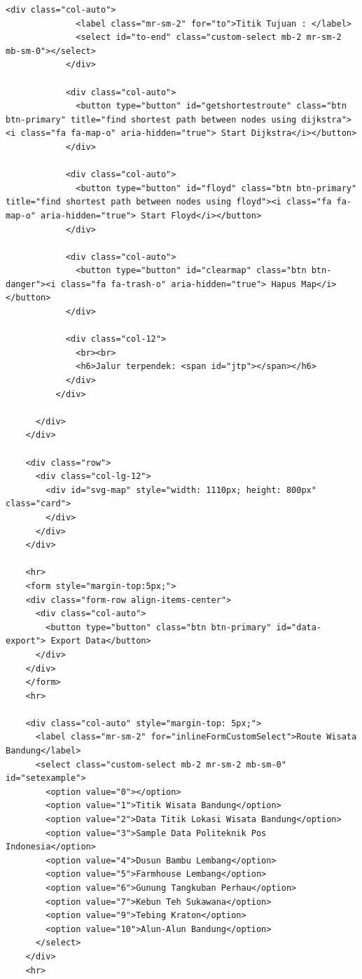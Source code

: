 \begin{enumerate}
\begin{lstlisting}[caption=index.php Full Code]
            <div class="col-auto">
              <label class="mr-sm-2" for="to">Titik Tujuan : </label>
              <select id="to-end" class="custom-select mb-2 mr-sm-2 mb-sm-0"></select>
            </div>

            <div class="col-auto">
              <button type="button" id="getshortestroute" class="btn btn-primary" title="find shortest path between nodes using dijkstra"><i class="fa fa-map-o" aria-hidden="true"> Start Dijkstra</i></button>
            </div>
            
            <div class="col-auto">
              <button type="button" id="floyd" class="btn btn-primary" title="find shortest path between nodes using floyd"><i class="fa fa-map-o" aria-hidden="true"> Start Floyd</i></button>
            </div>

            <div class="col-auto">
              <button type="button" id="clearmap" class="btn btn-danger"><i class="fa fa-trash-o" aria-hidden="true"> Hapus Map</i></button>
            </div>

            <div class="col-12">
              <br><br>
              <h6>Jalur terpendek: <span id="jtp"></span></h6>
            </div>
          </div>

      </div>
    </div>

    <div class="row">
      <div class="col-lg-12">
        <div id="svg-map" style="width: 1110px; height: 800px" class="card">
        </div>
      </div>
    </div>

    <hr>
    <form style="margin-top:5px;">
    <div class="form-row align-items-center">
      <div class="col-auto">
        <button type="button" class="btn btn-primary" id="data-export"> Export Data</button>
      </div>
    </div>
    </form>
    <hr>
    
    <div class="col-auto" style="margin-top: 5px;">
      <label class="mr-sm-2" for="inlineFormCustomSelect">Route Wisata Bandung</label>
      <select class="custom-select mb-2 mr-sm-2 mb-sm-0" id="setexample">
        <option value="0"></option>
        <option value="1">Titik Wisata Bandung</option>
        <option value="2">Data Titik Lokasi Wisata Bandung</option>
        <option value="3">Sample Data Politeknik Pos Indonesia</option>
        <option value="4">Dusun Bambu Lembang</option>
        <option value="5">Farmhouse Lembang</option>
        <option value="6">Gunung Tangkuban Perhau</option>
        <option value="7">Kebun Teh Sukawana</option>
        <option value="9">Tebing Kraton</option>
        <option value="10">Alun-Alun Bandung</option>
      </select>
    </div>
    <hr>


\end{lstlisting}
\end{enumerate}
